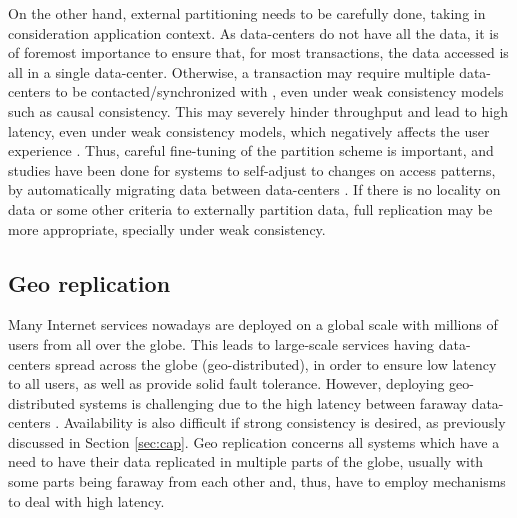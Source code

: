 On the other hand, external partitioning needs to be carefully done, taking in consideration application context.
As data-centers do not have all the data, it is of foremost importance to ensure that, for most transactions, the data accessed is all in a single data-center.
Otherwise, a transaction may require multiple data-centers to be contacted/synchronized with \cite{spanner, sipre, chronocache, slog}, even under weak consistency models such as causal consistency.
This may severely hinder throughput and lead to high latency, even under weak consistency models, which negatively affects the user experience \cite{eiger, mdcc}.
Thus, careful fine-tuning of the partition scheme is important, and studies have been done for systems to self-adjust to changes on access patterns, by automatically migrating data between data-centers \cite{slog}.
If there is no locality on data or some other criteria to externally partition data, full replication may be more appropriate, specially under weak consistency.



\subsection{Geo replication}


Many Internet services nowadays are deployed on a global scale with millions of users from all over the globe.
This leads to large-scale services having data-centers spread across the globe (geo-distributed), in order to ensure low latency to all users, as well as provide solid fault tolerance.
However, deploying geo-distributed systems is challenging due to the high latency between faraway data-centers \cite{mdcc, eiger, chronocache, slog}. Availability is also difficult if strong consistency is desired, as previously discussed in Section \ref{sec:cap}.
Geo replication concerns all systems which have a need to have their data replicated in multiple parts of the globe, usually with some parts being faraway from each other and, thus, have to employ mechanisms to deal with high latency.

